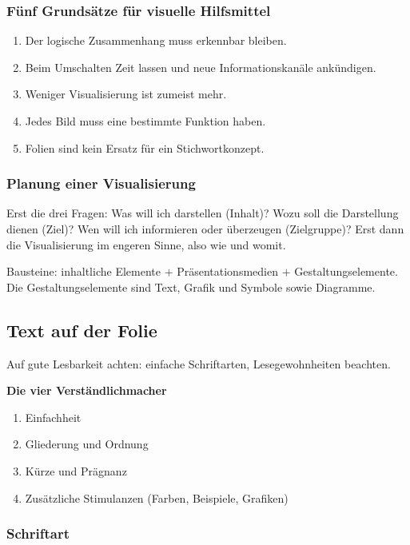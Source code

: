 \documentclass[12pt, a4paper]{article}
\begin{document}
\subsubsection{Fünf Grundsätze für visuelle Hilfsmittel}

\begin{enumerate}
  \item Der logische Zusammenhang muss erkennbar bleiben.
  \item Beim Umschalten Zeit lassen und neue Informationskanäle ankündigen.
  \item Weniger Visualisierung ist zumeist mehr.
  \item Jedes Bild muss eine bestimmte Funktion haben.
  \item Folien sind kein Ersatz für ein Stichwortkonzept.
\end{enumerate}

\subsubsection{Planung einer Visualisierung}

Erst die drei Fragen: Was will ich darstellen (Inhalt)? Wozu soll die
Darstellung dienen (Ziel)? Wen will ich informieren oder überzeugen
(Zielgruppe)? Erst dann die Visualisierung im engeren Sinne, also wie und
womit.

Bausteine: inhaltliche Elemente $+$ Präsentationsmedien $+$
Gestaltungselemente. Die Gestaltungselemente sind Text, Grafik und Symbole
sowie Diagramme.

\subsection{Text auf der Folie}

Auf gute Lesbarkeit achten: einfache Schriftarten, Lesegewohnheiten
beachten.

\begin{definitionbox}
\textbf{Die vier Verständlichmacher}
\begin{enumerate}
  \item Einfachheit
  \item Gliederung und Ordnung
  \item Kürze und Prägnanz
  \item Zusätzliche Stimulanzen (Farben, Beispiele, Grafiken)
\end{enumerate}
\end{definitionbox}

\subsubsection{Schriftart}
\end{document}
